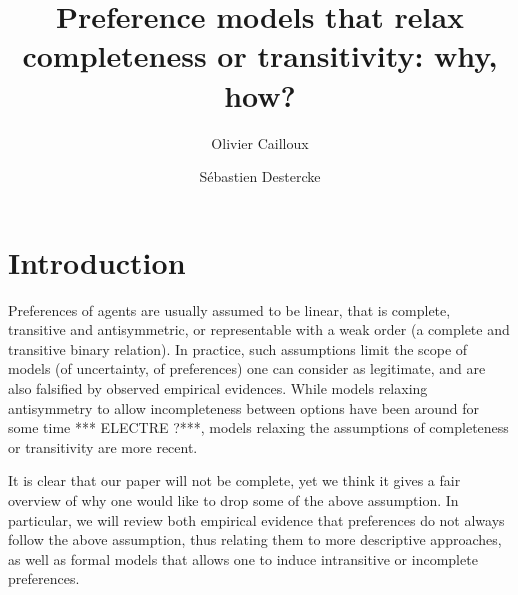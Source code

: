 \documentclass[french, english]{llncs}
\begin{document}
\title{Preference models that relax completeness or transitivity: why, how?}
\author{Olivier Cailloux \and Sébastien Destercke}
\maketitle


\setlength{\parindent}{1.5em}

\section{Introduction}

Preferences of agents are usually assumed to be linear, that is complete, transitive and antisymmetric, or representable with a weak order (a complete and transitive binary relation). In practice, such assumptions limit the scope of models (of uncertainty, of preferences) one can consider as legitimate, and are also falsified by observed empirical evidences. While models relaxing antisymmetry to allow incompleteness between options have been around for some time *** ELECTRE ?***, models relaxing the assumptions of completeness or transitivity are more recent.

It is clear that our paper will not be complete, yet we think it gives a fair overview of why one would like to drop some of the above assumption. In particular, we will review both empirical evidence that preferences do not always follow the above assumption, thus relating them to more descriptive approaches, as well as formal  models that allows one to induce intransitive or incomplete preferences. 
\end{document}
